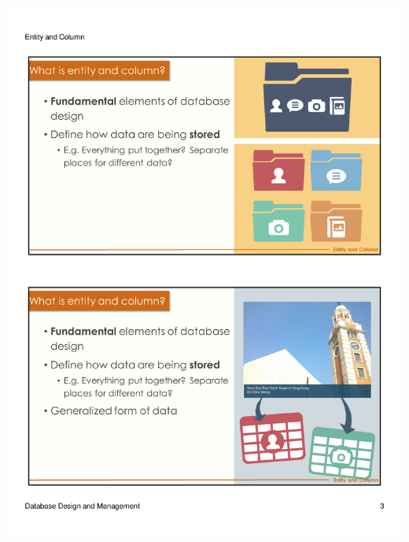 \begin{frame}{ }
    \centering
    \includegraphics[width=\textwidth, trim={10mm 134mm 10mm 22mm}, clip]{resources/02/02_3}
\end{frame}
